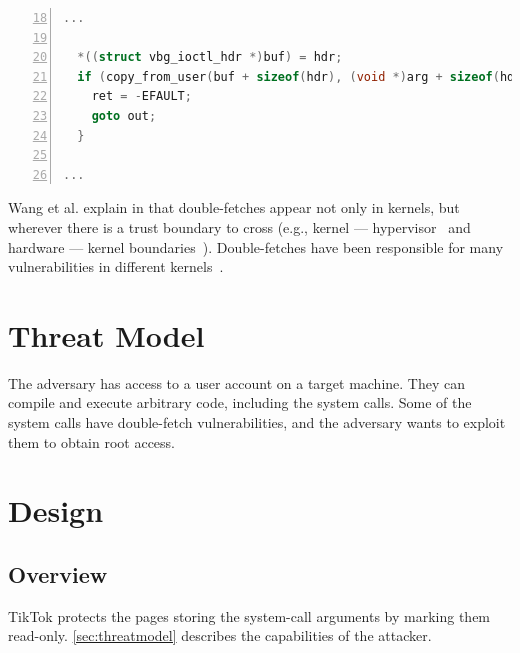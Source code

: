 \begin{lstlisting}[language=C, caption=CVE-2018-12633 Double Fetch Fix,
  label=code:cvedoublefetchfix,  breaklines=true
  postbreak=\mbox{\textcolor{red}{$\hookrightarrow$}\space},
  numbers=left,basicstyle=\scriptsize, firstnumber=18]
...

  *((struct vbg_ioctl_hdr *)buf) = hdr;
  if (copy_from_user(buf + sizeof(hdr), (void *)arg + sizeof(hdr), hdr.size_in - sizeof(hdr))) {
    ret = -EFAULT;
    goto out;
  }

...

\end{lstlisting}

Wang et al. explain in \cite{wang2018survey} that double-fetches appear not only
in kernels, but wherever there is a trust boundary to cross (e.g., kernel ---
hypervisor~\cite{wilhelm2016xenpwn} and hardware --- kernel
boundaries~\cite{lu2018untrusted}). Double-fetches have been responsible for many
vulnerabilities in different kernels~\cite{jurczyk2013bochspwn, wang2018survey}.


\section{Threat Model}
\label{sec:threatmodel}
The adversary has access to a user account on a target machine. They can compile
and execute arbitrary code, including the system calls. Some of the system calls
have double-fetch vulnerabilities, and the adversary wants to exploit them to
obtain root access.

\section{Design}
\label{sec:design}

\subsection{Overview}
\label{subsec:designoverview}

TikTok protects the pages storing the system-call arguments by marking them
read-only. \autoref{sec:threatmodel} describes the capabilities of the attacker.

